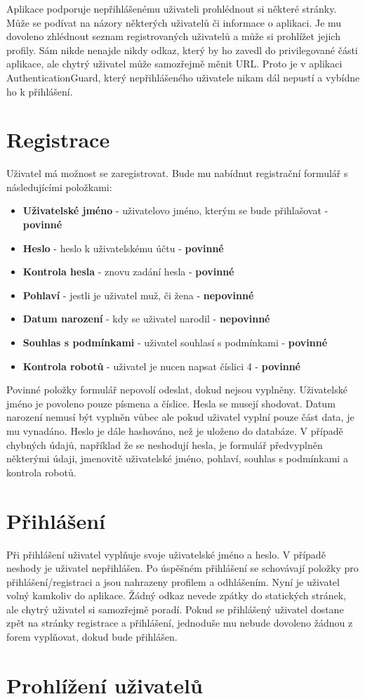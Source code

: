 \documentclass[
12pt,
a4paper,
pdftex,
czech,
titlepage
]{report}
\begin{document}
Aplikace podporuje nepřihlášenému uživateli prohlédnout si některé stránky. Může se podívat na názory některých uživatelů či informace o aplikaci. Je mu dovoleno zhlédnout seznam registrovaných uživatelů a může si prohlížet jejich profily. Sám nikde nenajde nikdy odkaz, který by ho zavedl do privilegované části aplikace, ale chytrý uživatel může samozřejmě měnit URL. Proto je v aplikaci AuthenticationGuard, který nepřihlášeného uživatele nikam dál nepustí a vybídne ho k přihlášení.

\section{Registrace}

Uživatel má možnost se zaregistrovat. Bude mu nabídnut registrační formulář s následujícími položkami:
\begin{itemize}
\item \textbf{Uživatelské jméno} - uživatelovo jméno, kterým se bude přihlašovat - \textbf{povinné}
\item \textbf{Heslo} - heslo k uživatelskému účtu - \textbf{povinné}
\item \textbf{Kontrola hesla} - znovu zadání hesla - \textbf{povinné}
\item \textbf{Pohlaví} - jestli je uživatel muž, či žena - \textbf{nepovinné}
\item \textbf{Datum narození} - kdy se uživatel narodil - \textbf{nepovinné}
\item \textbf{Souhlas s podmínkami} - uživatel souhlasí s podmínkami - \textbf{povinné}
\item \textbf{Kontrola robotů} - uživatel je nucen napsat číslici 4 - \textbf{povinné}
\end{itemize}

Povinné položky formulář nepovolí odeslat, dokud nejsou vyplněny. Uživatelské jméno je povoleno pouze písmena a číslice. Hesla se musejí shodovat. Datum narození nemusí být vyplněn vůbec ale pokud uživatel vyplní pouze část data, je mu vynadáno. Heslo je dále hashováno, než je uloženo do databáze. V případě chybných údajů, například že se neshodují hesla, je formulář předvyplněn některými údaji, jmenovitě uživatelské jméno, pohlaví, souhlas s podmínkami a kontrola robotů.

\section{Přihlášení}

Při přihlášení uživatel vyplňuje svoje uživatelské jméno a heslo. V případě neshody je uživatel nepřihlášen. Po úspěšném přihlášení se schovávají položky pro přihlášení/registraci a jsou nahrazeny profilem a odhlášením. Nyní je uživatel volný kamkoliv do aplikace. Žádný odkaz nevede zpátky do statických stránek, ale chytrý uživatel si samozřejmě poradí. Pokud se přihlášený uživatel dostane zpět na stránky registrace a přihlášení, jednoduše mu nebude dovoleno žádnou z forem vyplňovat, dokud bude přihlášen.

\section{Prohlížení uživatelů}
\end{document}
